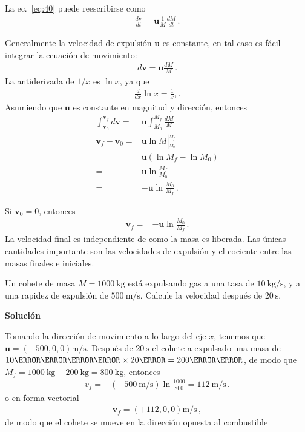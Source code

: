 La ec.~\eqref{eq:40} puede reescribirse como
\begin{align}
  \label{eq:m41}
  \frac{d\mathbf{v}}{dt}=\mathbf{u}\frac{1}{M}\frac{dM}{dt}\,.
\end{align}


Generalmente la velocidad de expulsión $\mathbf{u}$ es constante, en tal caso es fácil integrar la ecuación de movimiento:
\begin{align}
{d\mathbf{v}}=\mathbf{u}\frac{dM}{M}\,.
\end{align}
La antiderivada de $1/x$ es $\ln x$, ya que
\begin{align}
  \frac{d}{dx}\ln x=\frac{1}{x},.
\end{align}
Asumiendo que $\mathbf{u}$ es constante en magnitud y dirección,
entonces
\begin{align}
  \int_{\mathbf{v}_0}^{\mathbf{v}_f}{d\mathbf{v}}=&\mathbf{u}\int_{M_0}^{M_f}\frac{dM}{M}\nonumber\\
\mathbf{v}_f-\mathbf{v}_0=&\mathbf{u}\ln M\left|_{{}_{M_0}}^{{}^{M_f}}\right.\nonumber\\
=&\mathbf{u}\left(\ln M_f-\ln M_0\right)\nonumber\\
=&\mathbf{u}\ln\frac{M_f}{M_0}\nonumber\\
=&-\mathbf{u}\ln\frac{M_0}{M_f}\,.
\end{align}

Si $\mathbf{v}_0=0$, entonces
\begin{align}
  \mathbf{v}_f=&-\mathbf{u}\ln\frac{M_0}{M_f}\,.
\end{align}
La velocidad final es independiente de como la masa es liberada. Las únicas cantidades importante son las velocidades de expulsión y el cociente entre las masas finales e iniciales.

\ejemplo{}
\begin{frame}
  Un cohete de masa $M=\SI{1000}{\kilo\gram}$ está expulsando gas a
  una tasa de $\SI{10}{\kilo\gram\per\second}$, y a una rapidez de
  expulsión de $\SI{500}{\meter\per\second}$. Calcule la velocidad
  después de $\SI{20}{\second}$.

\noindent
\textbf{Solución}

Tomando la dirección de movimiento a lo largo del eje $x$, tenemos que $\mathbf{u}=(-500,0,0)\si{\meter\per\second}$. 
Después de $\SI{20}{\second}$ el cohete a expulsado una masa de $\SI{10}{\kilo\gram\per\second}\timesm\SI{20}{\second}=\SI{200}{\kilo\gram}$, de modo que $M_f=\SI{1000}{\kilo\gram}-\SI{200}{\kilo\gram}=\SI{800}{\kilo\gram}$, entonces
\begin{align}
  v_f=-(-\SI{500}{\meter\per\second})\ln\frac{1000}{800}=\SI{112}{\meter\per\second}\,.
\end{align}
o en forma vectorial
\begin{align*}
  \mathbf{v}_f=(+112,0,0)\si{\meter\per\second}\,,
\end{align*}
de modo que el cohete se mueve en la dirección opuesta al combustible
\end{frame}

